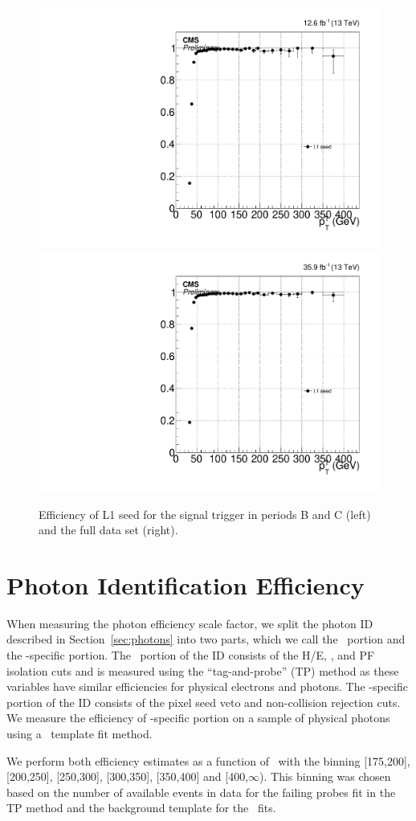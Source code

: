 \begin{figure}[htbp]
  \centering
  \includegraphics[width=0.48\linewidth]{Calibration/Figures/photon_elmuBCD_l1eg40_ptwide.pdf}
  \includegraphics[width=0.48\linewidth]{Calibration/Figures/photon_elmu_l1all_ptwide.pdf}
  \caption{
    Efficiency of L1 seed for the signal trigger in periods B and C (left) and the full data set (right).
  }
  \label{fig:l1_eff}
\end{figure}

\section{Photon Identification Efficiency}
\label{sec:photoneff}

When measuring the photon efficiency scale factor, we split the photon ID described in Section~\ref{sec:photons} into two parts, which we call the \egamma\ portion and the \Pgg-specific portion. 
The \egamma\ portion of the ID consists of the H/E, \sieie, and PF isolation cuts and is measured using the ``tag-and-probe'' (TP) method as these variables have similar efficiencies for physical electrons and photons. 
The \Pgg-specific portion of the ID consists of the pixel seed veto and non-collision rejection cuts.
We measure the efficiency of \Pgg-specific portion on a sample of physical photons using a \sieie\ template fit method.

We perform both efficiency estimates as a function of \pt\ with the binning [175,200], [200,250], [250,300], [300,350], [350,400] and [400,$\infty$). 
This binning was chosen based on the number of available events in data for the failing probes fit in the TP method and the background template for the \sieie\ fits.

